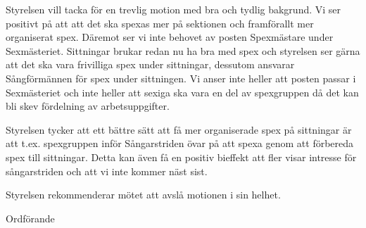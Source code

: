 \documentclass[../_main/handlingar.tex]{subfiles}
\begin{document}
\motionssvar

Styrelsen vill tacka för en trevlig motion med bra och tydlig bakgrund. Vi ser positivt på att att det ska spexas mer på sektionen och framförallt mer organiserat spex. Däremot ser vi inte behovet av posten Spexmästare under Sexmästeriet. Sittningar brukar redan nu ha bra med spex och styrelsen ser gärna att det ska vara frivilliga spex under sittningar, dessutom ansvarar Sångförmännen för spex under sittningen. Vi anser inte heller att posten passar i Sexmästeriet och inte heller att sexiga ska vara en del av spexgruppen då det kan bli skev fördelning av arbetsuppgifter. 

Styrelsen tycker att ett bättre sätt att få mer organiserade spex på sittningar är att t.ex. spexgruppen inför Sångarstriden övar på att spexa genom att förbereda spex till sittningar. Detta kan även få en positiv bieffekt att fler visar intresse för sångarstriden och att vi inte kommer näst sist.

Styrelsen rekommenderar mötet att avslå motionen i sin helhet. 


\begin{signatures}{1}
    \ist
    \signature{\ordf}{Ordförande}
\end{signatures}
\end{document}
